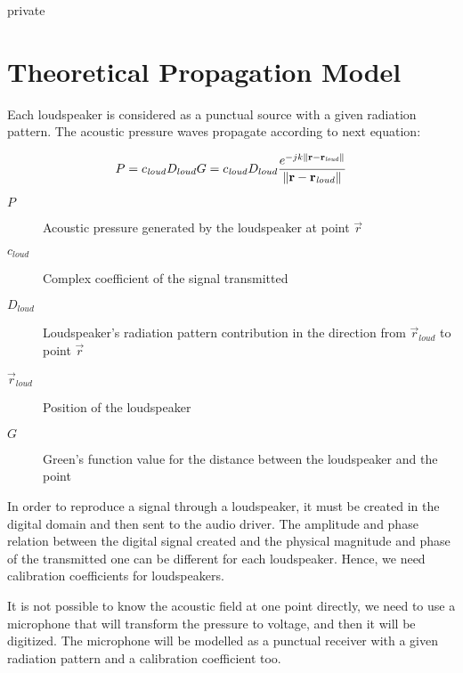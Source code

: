 \begin{shownto}{private}
\section{Theoretical Propagation Model}
\label{TheoreticalModelLabel}

Each loudspeaker is considered as a punctual source with a given radiation pattern. The acoustic pressure waves propagate according to next equation:

\begin{equation}
P = c_\mathit{loud} D_{loud} G = c_\mathit{loud} D_{loud} \frac{e^{-j k \left\| \mathbf{r} - \mathbf{r}_\mathit{loud} \right\|}}{\left\| \mathbf{r} - \mathbf{r}_\mathit{loud} \right\|}
\end{equation}

\begin{description}
	\item[$P$] Acoustic pressure generated by the loudspeaker at point $\vec{r}$
	\item[$c_\mathit{loud}$] Complex coefficient of the signal transmitted %
	\item[$D_{loud}$] Loudspeaker's radiation pattern contribution in the direction from $\vec{r}_\mathit{loud}$ to point $\vec{r}$%
	\item[$\vec{r}_{\mathit{loud}}$] Position of the loudspeaker
	\item[$G$] Green's function value for the distance between the loudspeaker and the point %
\end{description}

In order to reproduce a signal through a loudspeaker, it must be created in the digital domain and then sent to the audio driver. The amplitude and phase relation between the digital signal created and the physical magnitude and phase of the transmitted one can be different for each loudspeaker. Hence, we need calibration coefficients for loudspeakers.

It is not possible to know the acoustic field at one point directly, we need to use a microphone that will transform the pressure to voltage, and then it will be digitized. The microphone will be modelled as a punctual receiver with a given radiation pattern and a calibration coefficient too.


\end{shownto}
